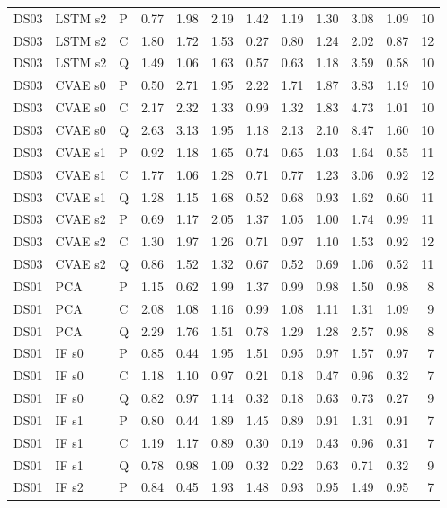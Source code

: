 \documentclass[10pt]{article}
\begin{document}
{\begin{longtable}{lllrrrrrrrrr}
DS03 & LSTM s2 & P & 0.77 & 1.98 & 2.19 & 1.42 & 1.19 & 1.30 & 3.08 & 1.09 & 10 \\
DS03 & LSTM s2 & C & 1.80 & 1.72 & 1.53 & 0.27 & 0.80 & 1.24 & 2.02 & 0.87 & 12 \\
DS03 & LSTM s2 & Q & 1.49 & 1.06 & 1.63 & 0.57 & 0.63 & 1.18 & 3.59 & 0.58 & 10 \\
DS03 & CVAE s0 & P & 0.50 & 2.71 & 1.95 & 2.22 & 1.71 & 1.87 & 3.83 & 1.19 & 10 \\
DS03 & CVAE s0 & C & 2.17 & 2.32 & 1.33 & 0.99 & 1.32 & 1.83 & 4.73 & 1.01 & 10 \\
DS03 & CVAE s0 & Q & 2.63 & 3.13 & 1.95 & 1.18 & 2.13 & 2.10 & 8.47 & 1.60 & 10 \\
DS03 & CVAE s1 & P & 0.92 & 1.18 & 1.65 & 0.74 & 0.65 & 1.03 & 1.64 & 0.55 & 11 \\
DS03 & CVAE s1 & C & 1.77 & 1.06 & 1.28 & 0.71 & 0.77 & 1.23 & 3.06 & 0.92 & 12 \\
DS03 & CVAE s1 & Q & 1.28 & 1.15 & 1.68 & 0.52 & 0.68 & 0.93 & 1.62 & 0.60 & 11 \\
DS03 & CVAE s2 & P & 0.69 & 1.17 & 2.05 & 1.37 & 1.05 & 1.00 & 1.74 & 0.99 & 11 \\
DS03 & CVAE s2 & C & 1.30 & 1.97 & 1.26 & 0.71 & 0.97 & 1.10 & 1.53 & 0.92 & 12 \\
DS03 & CVAE s2 & Q & 0.86 & 1.52 & 1.32 & 0.67 & 0.52 & 0.69 & 1.06 & 0.52 & 11 \\
\midrule
DS01 & PCA & P & 1.15 & 0.62 & 1.99 & 1.37 & 0.99 & 0.98 & 1.50 & 0.98 & 8 \\
DS01 & PCA & C & 2.08 & 1.08 & 1.16 & 0.99 & 1.08 & 1.11 & 1.31 & 1.09 & 9 \\
DS01 & PCA & Q & 2.29 & 1.76 & 1.51 & 0.78 & 1.29 & 1.28 & 2.57 & 0.98 & 8 \\
DS01 & IF s0 & P & 0.85 & 0.44 & 1.95 & 1.51 & 0.95 & 0.97 & 1.57 & 0.97 & 7 \\
DS01 & IF s0 & C & 1.18 & 1.10 & 0.97 & 0.21 & 0.18 & 0.47 & 0.96 & 0.32 & 7 \\
DS01 & IF s0 & Q & 0.82 & 0.97 & 1.14 & 0.32 & 0.18 & 0.63 & 0.73 & 0.27 & 9 \\
DS01 & IF s1 & P & 0.80 & 0.44 & 1.89 & 1.45 & 0.89 & 0.91 & 1.31 & 0.91 & 7 \\
DS01 & IF s1 & C & 1.19 & 1.17 & 0.89 & 0.30 & 0.19 & 0.43 & 0.96 & 0.31 & 7 \\
DS01 & IF s1 & Q & 0.78 & 0.98 & 1.09 & 0.32 & 0.22 & 0.63 & 0.71 & 0.32 & 9 \\
DS01 & IF s2 & P & 0.84 & 0.45 & 1.93 & 1.48 & 0.93 & 0.95 & 1.49 & 0.95 & 7 \\

\end{longtable}}
\end{document}
